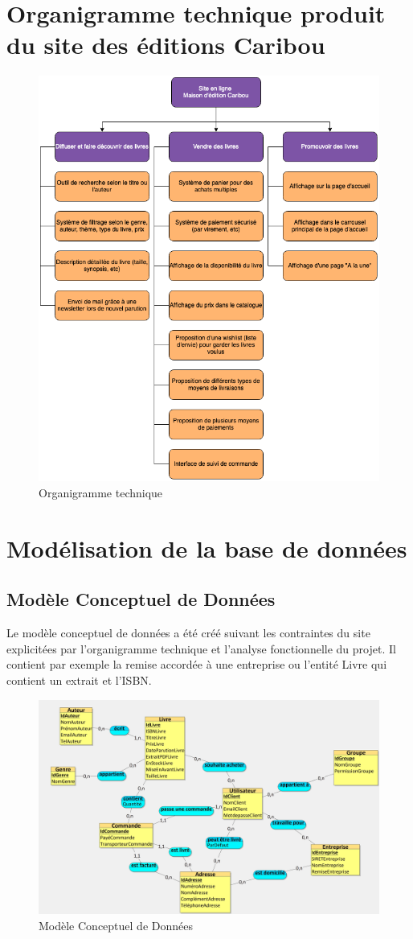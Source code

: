\documentclass[14pt]{extarticle}
\begin{document}
\section{Organigramme technique produit du site des éditions Caribou}
\begin{figure}[H]
    \centering
    \includegraphics[width=0.8\linewidth]{images/diag_technique.png}
    \caption{Organigramme technique}
\end{figure}
\section{Modélisation de la base de données}
\subsection{Modèle Conceptuel de Données}
Le modèle conceptuel de données a été créé suivant les contraintes du site explicitées par l'organigramme technique et l'analyse fonctionnelle du projet. Il contient par exemple la remise accordée à une entreprise ou l'entité Livre qui contient un extrait et l'ISBN.
\begin{figure}[H]
    \centering
    \includegraphics[width=0.9\linewidth]{images/mcd.jpg}
    \caption{Modèle Conceptuel de Données}
\end{figure}
\newpage
\end{document}
